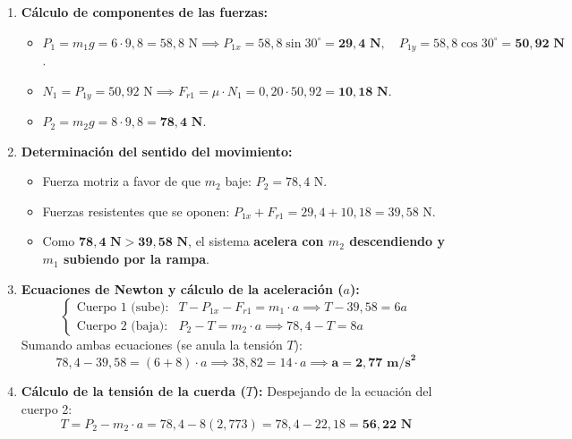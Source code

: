 ﻿\documentclass[11pt,a4paper]{article}
\begin{document}
\vspace{-0.1cm}
\begin{enumerate}[label=\textbf{\alph*)}, leftmargin=2em, itemsep=6pt]
    \item \textbf{Cálculo de componentes de las fuerzas:}
    \begin{itemize}[leftmargin=1.5em, itemsep=2pt]
        \item $P_1 = m_1 g = 6 \cdot 9{,}8 = 58{,}8\text{ N} \implies P_{1x} = 58{,}8 \sin 30^\circ = \mathbf{29{,}4\text{ N}}, \quad P_{1y} = 58{,}8 \cos 30^\circ = \mathbf{50{,}92\text{ N}}$.
        \item $N_1 = P_{1y} = 50{,}92\text{ N} \implies F_{r1} = \mu \cdot N_1 = 0{,}20 \cdot 50{,}92 = \mathbf{10{,}18\text{ N}}$.
        \item $P_2 = m_2 g = 8 \cdot 9{,}8 = \mathbf{78{,}4\text{ N}}$.
    \end{itemize}

    \item \textbf{Determinación del sentido del movimiento:}
    \begin{itemize}[leftmargin=1.5em, itemsep=2pt]
        \item Fuerza motriz a favor de que $m_2$ baje: $P_2 = 78{,}4\text{ N}$.
        \item Fuerzas resistentes que se oponen: $P_{1x} + F_{r1} = 29{,}4 + 10{,}18 = 39{,}58\text{ N}$.
        \item Como $\mathbf{78{,}4\text{ N} > 39{,}58\text{ N}}$, el sistema \textbf{acelera con $m_2$ descendiendo y $m_1$ subiendo por la rampa}.
    \end{itemize}

    \item \textbf{Ecuaciones de Newton y cálculo de la aceleración ($a$):}
    \[
    \begin{cases}
    \text{Cuerpo 1 (sube):} & T - P_{1x} - F_{r1} = m_1 \cdot a \implies T - 39{,}58 = 6a \\
    \text{Cuerpo 2 (baja):} & P_2 - T = m_2 \cdot a \implies 78{,}4 - T = 8a
    \end{cases}
    \]
    Sumando ambas ecuaciones (se anula la tensión $T$):
    \[
    78{,}4 - 39{,}58 = (6 + 8) \cdot a \implies 38{,}82 = 14 \cdot a \implies \mathbf{a = 2{,}77\text{ m/s}^2}
    \]

    \item \textbf{Cálculo de la tensión de la cuerda ($T$):}
    Despejando de la ecuación del cuerpo 2:
    \[
    T = P_2 - m_2 \cdot a = 78{,}4 - 8(2{,}773) = 78{,}4 - 22{,}18 = \mathbf{56{,}22\text{ N}}
    \]
\end{enumerate}
\end{document}

